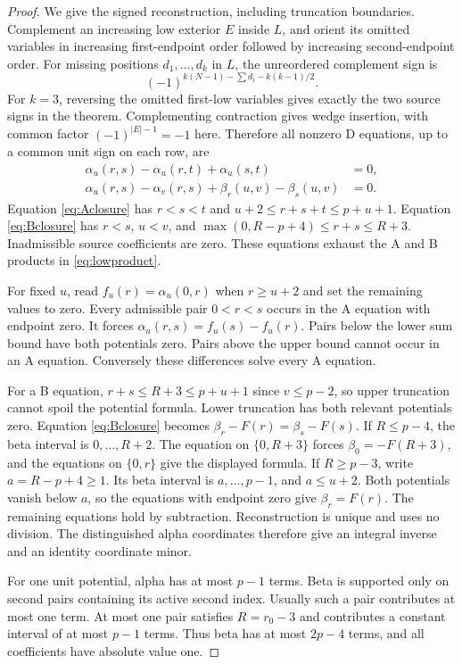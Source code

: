 \documentclass[11pt]{article}
\theoremstyle{definition}
\theoremstyle{remark}
\begin{document}
\begin{proof}
We give the signed reconstruction, including truncation boundaries.
Complement an increasing low exterior $E$ inside $L$, and orient its
omitted variables in increasing first-endpoint order followed by increasing
second-endpoint order. For missing positions $d_1,\ldots,d_k$ in $L$,
the unreordered complement sign is
\[
 (-1)^{k(N-1)-\sum d_i-k(k-1)/2}.
\]
For $k=3$, reversing the omitted first-low variables gives exactly the
two source signs in the theorem. Complementing contraction gives wedge
insertion, with common factor $(-1)^{|E|-1}=-1$ here. Therefore all
nonzero D equations, up to a common unit sign on each row, are
\begin{align}
 \alpha_u(r,s)-\alpha_u(r,t)+\alpha_u(s,t)&=0,\label{eq:Aclosure}\\
 \alpha_u(r,s)-\alpha_v(r,s)+\beta_r(u,v)-\beta_s(u,v)&=0.\label{eq:Bclosure}
\end{align}
Equation \eqref{eq:Aclosure} has $r<s<t$ and
$u+2\leq r+s+t\leq p+u+1$. Equation \eqref{eq:Bclosure} has
$r<s$, $u<v$, and
$\max(0,R-p+4)\leq r+s\leq R+3$. Inadmissible source coefficients
are zero. These equations exhaust the A and B products in
\eqref{eq:lowproduct}.

For fixed $u$, read $f_u(r)=\alpha_u(0,r)$ when $r\geq u+2$ and
set the remaining values to zero. Every admissible pair $0<r<s$ occurs
in the A equation with endpoint zero. It forces
$\alpha_u(r,s)=f_u(s)-f_u(r)$. Pairs below the lower sum bound have
both potentials zero. Pairs above the upper bound cannot occur in an A
equation. Conversely these differences solve every A equation.

For a B equation, $r+s\leq R+3\leq p+u+1$ since $v\leq p-2$,
so upper truncation cannot spoil the potential formula. Lower truncation
has both relevant potentials zero. Equation \eqref{eq:Bclosure} becomes
$\beta_r-F(r)=\beta_s-F(s)$. If $R\leq p-4$, the beta interval is
$0,\ldots,R+2$. The equation on $\{0,R+3\}$ forces
$\beta_0=-F(R+3)$, and the equations on $\{0,r\}$ give the displayed
formula. If $R\geq p-3$, write $a=R-p+4\geq1$. Its beta interval
is $a,\ldots,p-1$, and $a\leq u+2$. Both potentials vanish below
$a$, so the equations with endpoint zero give $\beta_r=F(r)$.
The remaining equations hold by subtraction. Reconstruction is unique
and uses no division. The distinguished alpha coordinates therefore give
an integral inverse and an identity coordinate minor.

For one unit potential, alpha has at most $p-1$ terms. Beta is supported
only on second pairs containing its active second index. Usually such a
pair contributes at most one term. At most one pair satisfies
$R=r_0-3$ and contributes a constant interval of at most $p-1$ terms.
Thus beta has at most $2p-4$ terms, and all coefficients have absolute
value one.


\end{proof}
\end{document}
